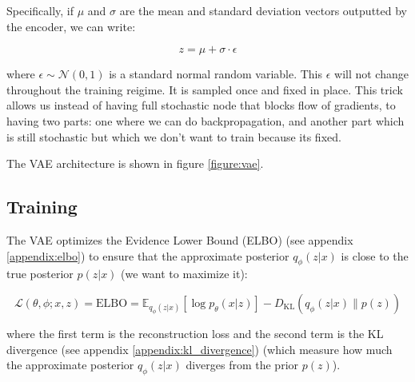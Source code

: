 Specifically, if $\mu$ and $\sigma$ are the mean and standard deviation vectors outputted by the encoder, we can write:

\begin{equation}
    z = \mu + \sigma \cdot \epsilon
\end{equation}

where $\epsilon \sim \mathcal{N}(0, 1)$ is a standard normal random variable. This $\epsilon$ will not change throughout the training reigime. It is sampled once and fixed in place. This trick allows us instead of having full stochastic node that blocks flow of gradients, to having two parts: one where we can do backpropagation, and another part which is still stochastic but which we don't want to train because its fixed.



The VAE architecture is shown in figure \ref{figure:vae}.

\subsection{Training}

The VAE optimizes the Evidence Lower Bound (ELBO) (see appendix \ref{appendix:elbo}) to ensure that the approximate posterior $q_\phi (z|x)$ is close to the true posterior $p(z|x)$ (we want to maximize it):

\begin{equation}
    \mathcal{L}(\theta, \phi; x, z) = \text{ELBO} = \mathbb{E}_{q_\phi(z|x)} \left[ \log p_\theta(x|z) \right] - D_\text{KL}(q_\phi(z|x) \| p(z))
\end{equation}

where the first term is the reconstruction loss and the second term is the KL divergence (see appendix \ref{appendix:kl_divergence}) (which measure how much the approximate posterior $q_\phi (z|x)$ diverges from the prior $p(z)$). 